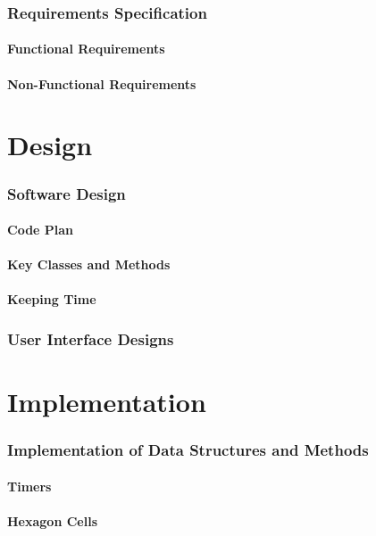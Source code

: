 \documentclass[10pt,a4paper]{article}
\begin{document}
\section{Requirements Specification}

\subsection{Functional Requirements}

\subsection{Non-Functional Requirements}


\part{Design}
\section{Software Design}
\subsection{Code Plan}
\subsection{Key Classes and Methods}
\subsection{Keeping Time}

\section{User Interface Designs}

\part{Implementation}
\section{Implementation of Data Structures and Methods}
\subsection{Timers}
\subsection{Hexagon Cells}
\end{document}
